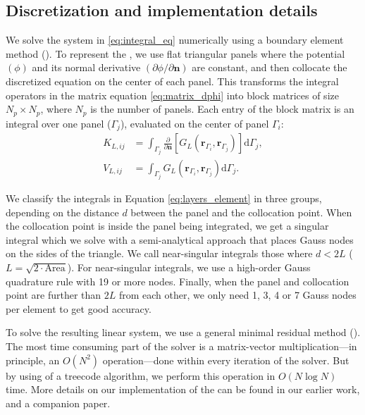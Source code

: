 
\subsection{Discretization and implementation details}

We solve the system in \eqref{eq:integral_eq} numerically using a boundary element method (\bem). To represent the \ses, we use flat triangular panels where the potential $(\phi)$ and its normal derivative $(\partial \phi /\partial \mathbf{n})$ are constant, and then collocate the discretized equation on the center of each panel. This transforms the integral operators in the matrix equation \eqref{eq:matrix_dphi} into block matrices of size $N_p \times N_p$, where $N_p$ is the number of panels. Each entry of the block matrix is an integral over one panel ($\Gamma_j$), evaluated on the center of panel $\Gamma_i$:
%
\begin{align} \label{eq:layers_element}
K_{L,ij} &= \int_{\Gamma_j} \frac{\partial}{\partial \mathbf{n}} \left[ G_L(\mathbf{r}_{\Gamma_i},\mathbf{r}_{\Gamma_j}) \right]\mathrm{d} \Gamma_j, \nonumber \\
V_{L,ij} &= \int_{\Gamma_j} G_L(\mathbf{r}_{\Gamma_i},\mathbf{r}_{\Gamma_j})  \mathrm{d} \Gamma_j.
\end{align}

We classify the integrals in Equation \eqref{eq:layers_element} in three groups, depending on the distance $d$ between the panel and the collocation point. 
When the collocation point is inside the panel being integrated, we get a singular integral which we solve with a semi-analytical approach\cite{ZhuHuangSongWhite2001} that places Gauss nodes on the sides of the triangle. 
We call near-singular integrals those where $d<2L$ ($L = \sqrt{2\cdot \text{Area}}$). For near-singular integrals, we use a high-order Gauss quadrature rule with 19 or more nodes. 
Finally, when the panel and collocation point are further than $2L$ from each other, we only need 1, 3, 4 or 7 Gauss nodes per element to get good accuracy.

To solve the resulting linear system, we use a general minimal residual method (\gmres). The most time consuming part of the \gmres solver is a matrix-vector multiplication---in principle, an $O(N^2)$ operation---done within every iteration of the solver. But by using of a treecode algorithm, we perform this operation in $O(N\log N)$ time.\cite{BarnesHut1986} More details on our implementation of the \bem can be found in our earlier work,\cite{CooperBarba-share154331} and a companion paper.\cite{CooperBarba2015a}
